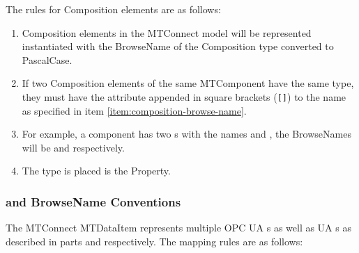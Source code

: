 The rules for \gls{Composition} elements are as follows: 

\begin{enumerate}
  \item  \gls{Composition} elements in the MTConnect model will be represented instantiated with the \gls{BrowseName} of the \gls{Composition} \gls{type} converted to \gls{PascalCase}. \label{item:composition-browse-name}
  \item If two \gls{Composition} elements of the same \gls{MTComponent} have the same \gls{type}, they must have the  attribute appended in square brackets (\texttt{[]}) to the name as specified in item \ref{item:composition-browse-name}.
  \item For example, a component has two s with the names  and , the \glspl{BrowseName} will be  and  respectively.
  \item The type is placed is the  \gls{Property}.
\end{enumerate}

\subsubsection{  and \gls{BrowseName} Conventions}
\label{sec:data-item-conventions}

The MTConnect \gls{MTDataItem} represents multiple OPC UA s as well as UA s as described in parts \cite{UAPart8} and \cite{UAPart9} respectively. The mapping rules are as follows:

